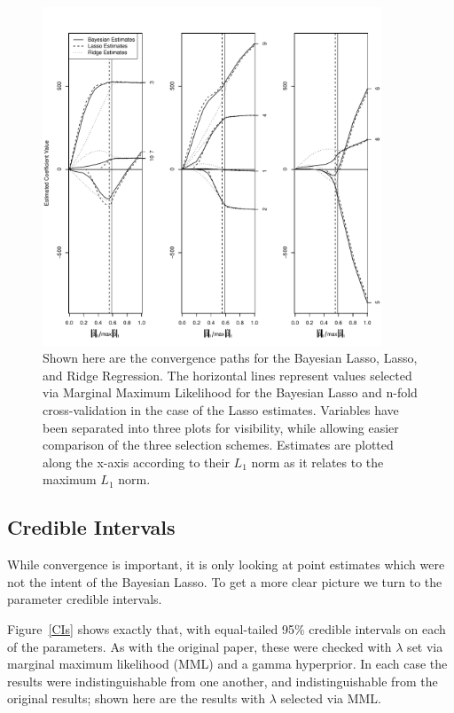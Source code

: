 \documentclass{uwstat572}
\begin{document}
\begin{figure}\label{convergence}
  \centering
    \includegraphics[width=0.9\textwidth]{SaveFigure1.pdf}
  \caption{Shown here are the convergence paths for the Bayesian Lasso, Lasso, and Ridge Regression. The horizontal lines represent values selected via Marginal Maximum Likelihood for the Bayesian Lasso and n-fold cross-validation in the case of the Lasso estimates. Variables have been separated into three plots for visibility, while allowing easier comparison of the three selection schemes. Estimates are plotted along the x-axis according to their $L_1$ norm as it relates to the maximum $L_1$ norm.}
\end{figure}

\subsection{Credible Intervals}
While convergence is important, it is only looking at point estimates which were not the intent of the Bayesian Lasso. To get a more clear picture we turn to the parameter credible intervals. 

Figure~\ref{CIs} shows exactly that, with equal-tailed 95\% credible intervals on each of the parameters. As with the original paper, these were checked with $\lambda$ set via marginal maximum likelihood (MML) and a gamma hyperprior. In each case the results were indistinguishable from one another, and indistinguishable from the original results; shown here are the results with $\lambda$ selected via MML.
\end{document}
